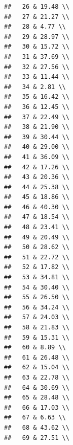 \documentclass{article}\usepackage[]{graphicx}\usepackage[]{color}
\makeatletter
\newenvironment{kframe}{%
 \def\at@end@of@kframe{}%
 \ifinner\ifhmode%
  \def\at@end@of@kframe{\end{minipage}}%
  \begin{minipage}{\columnwidth}%
 \fi\fi%
 \def\FrameCommand##1{\hskip\@totalleftmargin \hskip-\fboxsep
 \colorbox{shadecolor}{##1}\hskip-\fboxsep
     \hskip-\linewidth \hskip-\@totalleftmargin \hskip\columnwidth}%
 \MakeFramed {\advance\hsize-\width
   \@totalleftmargin\z@ \linewidth\hsize
   \@setminipage}}%
 {\par\unskip\endMakeFramed%
 \at@end@of@kframe}
\newenvironment{knitrout}{}{} %
\makeatother
\begin{document}
\begin{knitrout}
\begin{kframe}
\begin{verbatim}
##   26 & 19.48 \\ 
##   27 & 21.27 \\ 
##   28 & 4.77 \\ 
##   29 & 28.97 \\ 
##   30 & 15.72 \\ 
##   31 & 37.69 \\ 
##   32 & 27.56 \\ 
##   33 & 11.44 \\ 
##   34 & 2.81 \\ 
##   35 & 16.42 \\ 
##   36 & 12.45 \\ 
##   37 & 22.49 \\ 
##   38 & 21.90 \\ 
##   39 & 30.44 \\ 
##   40 & 29.00 \\ 
##   41 & 36.09 \\ 
##   42 & 17.26 \\ 
##   43 & 20.36 \\ 
##   44 & 25.38 \\ 
##   45 & 18.86 \\ 
##   46 & 40.30 \\ 
##   47 & 18.54 \\ 
##   48 & 23.41 \\ 
##   49 & 20.49 \\ 
##   50 & 28.62 \\ 
##   51 & 22.72 \\ 
##   52 & 17.82 \\ 
##   53 & 34.81 \\ 
##   54 & 30.40 \\ 
##   55 & 26.50 \\ 
##   56 & 34.24 \\ 
##   57 & 24.03 \\ 
##   58 & 21.83 \\ 
##   59 & 15.31 \\ 
##   60 & 8.89 \\ 
##   61 & 26.48 \\ 
##   62 & 15.04 \\ 
##   63 & 22.78 \\ 
##   64 & 30.69 \\ 
##   65 & 28.48 \\ 
##   66 & 17.03 \\ 
##   67 & 6.63 \\ 
##   68 & 43.62 \\ 
##   69 & 27.51 \\ 

\end{verbatim}
\end{kframe}
\end{knitrout}
\end{document}
